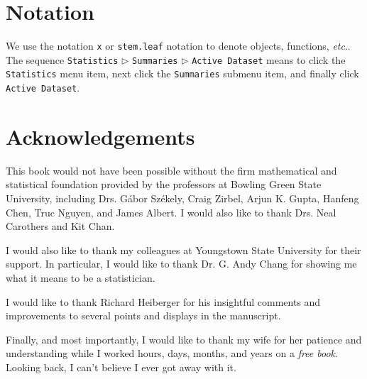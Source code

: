 \section*{Notation}

We use the notation \texttt{x} or \texttt{stem.leaf} notation to denote objects, functions, \emph{etc}.. The sequence \texttt{Statistics} \(\triangleright\) \texttt{Summaries} \(\triangleright\) \texttt{Active Dataset} means to click the \texttt{Statistics} menu item, next click the \texttt{Summaries} submenu item, and finally click \texttt{Active Dataset}.

\section*{Acknowledgements}

This book would not have been possible without the firm mathematical and statistical foundation provided by the professors at Bowling Green State University, including Drs. G\'{a}{}bor Sz\'{e}{}kely, Craig Zirbel, Arjun K. Gupta, Hanfeng Chen, Truc Nguyen, and James Albert. I would also like to thank Drs. Neal Carothers and Kit Chan. 

I would also like to thank my colleagues at Youngstown State University for their support. In particular, I would like to thank Dr. G. Andy Chang for showing me what it means to be a statistician.

I would like to thank Richard Heiberger for his insightful comments and improvements to several points and displays in the manuscript. 

Finally, and most importantly, I would like to thank my wife for her patience and understanding while I worked hours, days, months, and years on a \emph{free book}. Looking back, I can't believe I ever got away with it.

\vfill{}
\cleardoublepage
{}
{}
\listoffigures

\vfill{}
\cleardoublepage
{}
{}
\listoftables

